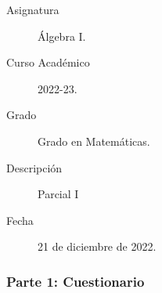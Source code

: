 \documentclass[12pt]{article}
\begin{document}

    
    

    \begin{description}
        \item[Asignatura] Álgebra I.
        \item[Curso Académico] 2022-23.
        \item[Grado] Grado en Matemáticas.
        \item[Descripción] Parcial I
        \item[Fecha] 21 de diciembre de 2022.
    \end{description}
    \newpage
    \subsubsection*{Parte 1: Cuestionario}
\end{document}
